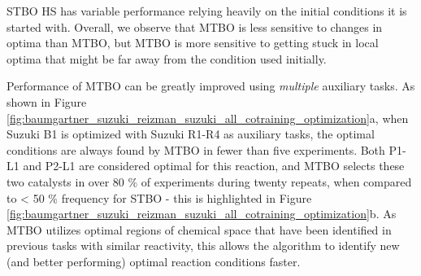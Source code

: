 STBO HS has variable performance relying heavily on the initial conditions it is started with. Overall, we observe that MTBO is less sensitive to changes in optima than MTBO, but MTBO is more sensitive to getting stuck in local optima that might be far away from the condition used initially. 

Performance of MTBO can be greatly improved using \textit{multiple} auxiliary tasks. As shown in Figure \ref{fig:baumgartner_suzuki_reizman_suzuki_all_cotraining_optimization}a, when Suzuki B1 is optimized with Suzuki R1-R4 as auxiliary tasks, the optimal conditions are always found by MTBO in fewer than five experiments. Both P1-L1 and P2-L1 are considered optimal for this reaction, and MTBO selects these two catalysts in over 80 \% of experiments during twenty repeats, when compared to \textless{} 50 \% frequency for STBO - this is highlighted in Figure \ref{fig:baumgartner_suzuki_reizman_suzuki_all_cotraining_optimization}b. As MTBO utilizes optimal regions of chemical space that have been identified in previous tasks with similar reactivity, this allows the algorithm to identify new (and better performing) optimal reaction conditions faster.

